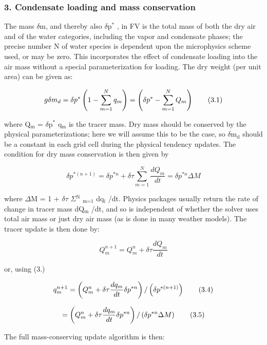\subsubsection*{3. Condensate loading and mass conservation}

The mass {$\delta$}m, and thereby also {$\delta$}p$^{\mbox{$\ast$}}$ , in F\-V is the total mass of both the dry air and of the water categories, including the vapor and condensate phases; the precise number N of water species is dependent upon the microphysics scheme used, or may be zero. This incorporates the effect of condensate loading into the air mass without a special parameterization for loading. The dry weight (per unit area) can be given as\-:

\[ g \delta m_d = \delta p^* \left( 1 - \sum_{m=1}^N q_m \right) = \left( \delta p^* - \sum_{m=1}^N Q_m \right) \\ \tag {3.1} \]

where Q$_{\mbox{m}}$  = {$\delta$}p$^{\mbox{$\ast$}}$  q$_{\mbox{m}}$  is the tracer mass. Dry mass should be conserved by the physical parameterizations; here we will assume this to be the case, so {$\delta$}m$_{\mbox{d}}$  should be a constant in each grid cell during the physical tendency updates. The condition for dry mass conservation is then given by

\[ \delta p^{*(n+1)} = \delta p^{*n} + \delta \tau \sum_{m=1}^N \frac{dQ_m}{dt} = \delta p^{*n} \Delta M \tag {3.2} \]

where {$\Delta$}M = 1 + {$\delta$}{$\tau$} {$\Sigma$}$^{\mbox{N}}$ $_{\mbox{m=1}}$  dq$_{\mbox{i}}$ /dt. Physics packages usually return the rate of change in tracer mass d\-Q$_{\mbox{m}}$  /dt, and so is independent of whether the solver uses total air mass or just dry air mass (as is done in many weather models). The tracer update is then done by\-:

\[ Q^{n+1}_m = Q^n_m + \delta \tau \frac{dQ_m}{dt} \tag {3.3} \]

or, using (3.)

\[ q^{n+1}_m = \left( Q^n_m + \delta \tau \frac{dq_m}{dt} \delta p^{*n} \right) / \left( \delta p^{*(n+1)} \right) \\ \tag {3.4} \]

\[ = \left( Q^n_m + \delta \tau \frac{dq_m}{dt}\delta p^{*n} \right) / \left( \delta p^{*n} \Delta M \right) \\ \tag {3.5} \]

The full mass-\/conserving update algorithm is then\-:

